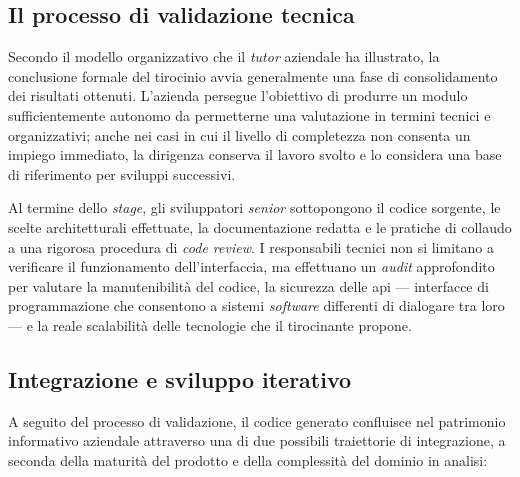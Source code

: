 \subsection{Il processo di validazione tecnica}
\label{subsec:validazione_tecnica}

Secondo il modello organizzativo che il \textit{tutor} aziendale ha illustrato, la conclusione formale del tirocinio avvia generalmente una fase di consolidamento dei risultati ottenuti. L'azienda persegue l'obiettivo di produrre un modulo sufficientemente autonomo da permetterne una valutazione in termini tecnici e organizzativi; anche nei casi in cui il livello di completezza non consenta un impiego immediato, la dirigenza conserva il lavoro svolto e lo considera una base di riferimento per sviluppi successivi.

Al termine dello \textit{stage}, gli sviluppatori \textit{senior} sottopongono il codice sorgente, le scelte architetturali effettuate, la documentazione redatta e le pratiche di collaudo a una rigorosa procedura di \textit{code review}. I responsabili tecnici non si limitano a verificare il funzionamento dell'interfaccia, ma effettuano un \textit{audit} approfondito per valutare la manutenibilità del codice, la sicurezza delle \gls{api} --- interfacce di programmazione che consentono a sistemi \textit{software} differenti di dialogare tra loro --- e la reale scalabilità delle tecnologie che il tirocinante propone.

\subsection{Integrazione e sviluppo iterativo}
\label{subsec:integrazione_sviluppo}

A seguito del processo di validazione, il codice generato confluisce nel patrimonio informativo aziendale attraverso una di due possibili traiettorie di integrazione, a seconda della maturità del prodotto e della complessità del dominio in analisi:

